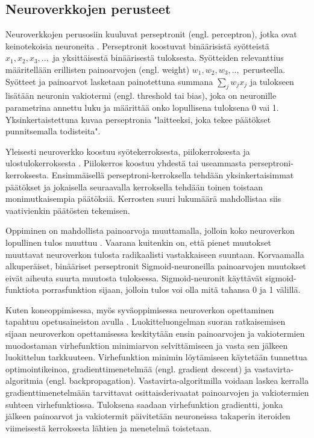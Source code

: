 \documentclass[utf8]{gradu3}
\begin{document}
\subsection{Neuroverkkojen perusteet}

Neuroverkkojen perusosiin kuuluvat perseptronit (engl. perceptron), jotka ovat keinotekoisia neuroneita \parencite{nielsen2015neural}. Perseptronit koostuvat binäärisistä syötteistä \(x_{1}, x_{2}, x_{3},..,\) ja yksittäisestä binäärisestä tuloksesta. Syötteiden relevanttius määritellään erillisten painoarvojen (engl. weight) \(w_{1}, w_{2}, w_{3},..,\) perusteella. Syötteet ja painoarvot lasketaan painotettuna summana $\sum_{j}w_{j}x_{j}$ ja tulokseen lisätään neuronin vakiotermi (engl. threshold tai bias), joka on neuronille parametrina annettu luku ja määrittää onko lopullisena tuloksena 0 vai 1. Yksinkertaistettuna \textcite{nielsen2015neural} kuvaa perseptronia "laitteeksi, joka tekee päätökset punnitsemalla todisteita".

Yleisesti neuroverkko koostuu syötekerroksesta, piilokerroksesta ja ulostulokerroksesta \parencite{nielsen2015neural}. Piilokerros koostuu yhdestä tai useammasta perseptroni-kerroksesta. Ensimmäisellä perseptroni-kerroksella tehdään yksinkertaisimmat päätökset ja jokaisella seuraavalla kerroksella tehdään toinen toistaan monimutkaisempia päätöksiä. Kerrosten suuri lukumäärä mahdollistaa siis vaativienkin päätösten tekemisen.

Oppiminen on mahdollista painoarvoja muuttamalla, jolloin koko neuroverkon lopullinen tulos muuttuu \parencite{nielsen2015neural}. Vaarana kuitenkin on, että pienet muutokset muuttavat neuroverkon tulosta radikaalisti vastakkaiseen suuntaan. Korvaamalla alkuperäiset, binääriset perseptronit Sigmoid-neuroneilla painoarvojen muutokset eivät aiheuta suurta muutosta tuloksessa. Sigmoid-neuronit käyttävät sigmoid-funktiota porrasfunktion sijaan, jolloin tulos voi olla mitä tahansa 0 ja 1 välillä.

Kuten koneoppimisessa, myös syväoppimisessa neuroverkon opettaminen tapahtuu opetusaineiston avulla \parencite{nielsen2015neural}. Luokitteluongelman suoran ratkaisemisen sijaan neuroverkon opettamisessa keskitytään ensin painoarvojen ja vakiotermien muodostaman virhefunktion minimiarvon selvittämiseen ja vasta sen jälkeen luokittelun tarkkuuteen. Virhefunktion minimin löytämiseen käytetään tunnettua optimointikeinoa, gradienttimenetelmää (engl. gradient descent) ja vastavirta-algoritmia (engl. backpropagation). Vastavirta-algoritmilla voidaan laskea kerralla gradienttimenetelmään tarvittavat osittaisderivaatat painoarvojen ja vakiotermien suhteen virhefunktiossa. Tuloksena saadaan virhefunktion gradientti, jonka jälkeen painoarvot ja vakiotermit päivitetään neuroneissa takaperin iteroiden viimeisestä kerroksesta lähtien ja menetelmä toistetaan.
\end{document}
